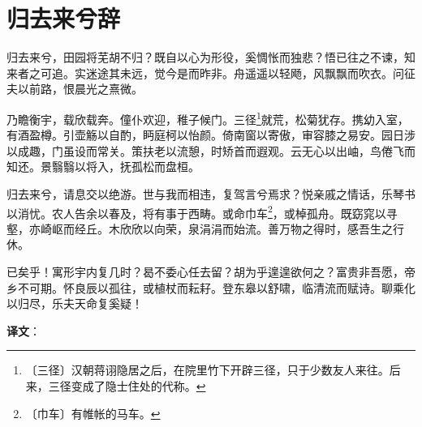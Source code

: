 \documentclass[12pt,UTF-8,openany]{ctexbook}
\begin{document}
\chapter{归去来兮辞}

\begin{normalsize}
    
    归去来兮，田园将芜胡不归？既自以心为形役，奚惆怅而独悲？悟已往之不谏，知来者之可追。实迷途其未远，觉今是而昨非。舟遥遥以轻飏，风飘飘而吹衣。问征夫以前路，恨晨光之熹微。
    
    乃瞻衡宇，载欣载奔。僮仆欢迎，稚子候门。三径\footnote{〔三径〕汉朝蒋诩隐居之后，在院里竹下开辟三径，只于少数友人来往。后来，三径变成了隐士住处的代称。}就荒，松菊犹存。携幼入室，有酒盈樽。引壶觞以自酌，眄庭柯以怡颜。倚南窗以寄傲，审容膝之易安。园日涉以成趣，门虽设而常关。策扶老以流憩，时矫首而遐观。云无心以出岫，鸟倦飞而知还。景翳翳以将入，抚孤松而盘桓。
    
    归去来兮，请息交以绝游。世与我而相违，复驾言兮焉求？悦亲戚之情话，乐琴书以消忧。农人告余以春及，将有事于西畴。或命巾车\footnote{〔巾车〕有帷帐的马车。}，或棹孤舟。既窈窕以寻壑，亦崎岖而经丘。木欣欣以向荣，泉涓涓而始流。善万物之得时，感吾生之行休。
    
    已矣乎！寓形宇内复几时？曷不委心任去留？胡为乎遑遑欲何之？富贵非吾愿，帝乡不可期。怀良辰以孤往，或植杖而耘耔。登东皋以舒啸，临清流而赋诗。聊乘化以归尽，乐夫天命复奚疑！
\end{normalsize}


\newpage

\textbf{译文}：

\vspace{1em}
\end{document}
